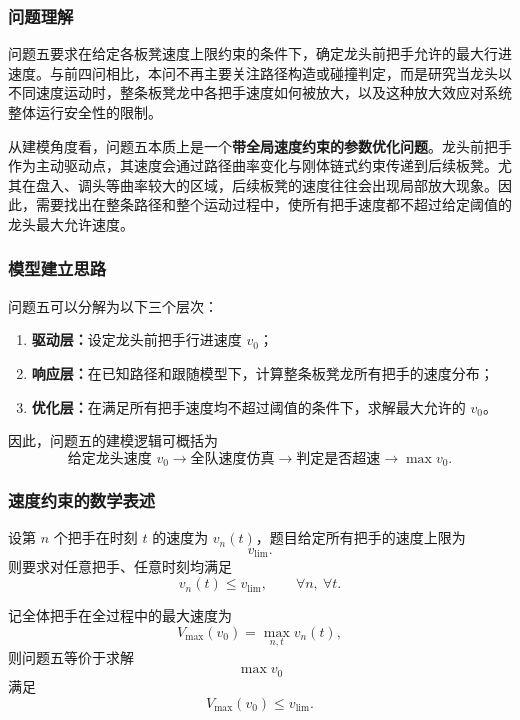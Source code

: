 \documentclass[12pt,a4paper]{ctexart}
\begin{document}
\subsubsection{问题理解}
问题五要求在给定各板凳速度上限约束的条件下，确定龙头前把手允许的最大行进速度。与前四问相比，本问不再主要关注路径构造或碰撞判定，而是研究当龙头以不同速度运动时，整条板凳龙中各把手速度如何被放大，以及这种放大效应对系统整体运行安全性的限制。

从建模角度看，问题五本质上是一个\textbf{带全局速度约束的参数优化问题}。龙头前把手作为主动驱动点，其速度会通过路径曲率变化与刚体链式约束传递到后续板凳。尤其在盘入、调头等曲率较大的区域，后续板凳的速度往往会出现局部放大现象。因此，需要找出在整条路径和整个运动过程中，使所有把手速度都不超过给定阈值的龙头最大允许速度。

\subsubsection{模型建立思路}
问题五可以分解为以下三个层次：

\begin{enumerate}
    \item \textbf{驱动层：}设定龙头前把手行进速度 $v_0$；
    \item \textbf{响应层：}在已知路径和跟随模型下，计算整条板凳龙所有把手的速度分布；
    \item \textbf{优化层：}在满足所有把手速度均不超过阈值的条件下，求解最大允许的 $v_0$。
\end{enumerate}

因此，问题五的建模逻辑可概括为
\[
\text{给定龙头速度 } v_0 \longrightarrow \text{全队速度仿真} \longrightarrow \text{判定是否超速} \longrightarrow \max v_0.
\]

\subsubsection{速度约束的数学表述}
设第 $n$ 个把手在时刻 $t$ 的速度为 $v_n(t)$，题目给定所有把手的速度上限为
\begin{equation}
v_{\mathrm{lim}}.
\end{equation}
则要求对任意把手、任意时刻均满足
\begin{equation}
v_n(t)\le v_{\mathrm{lim}}, \qquad \forall n,\ \forall t.
\end{equation}

记全体把手在全过程中的最大速度为
\begin{equation}
V_{\max}(v_0)=\max_{n,t} v_n(t),
\end{equation}
则问题五等价于求解
\begin{equation}
\max v_0
\end{equation}
满足
\begin{equation}
V_{\max}(v_0)\le v_{\mathrm{lim}}.
\end{equation}
\end{document}
